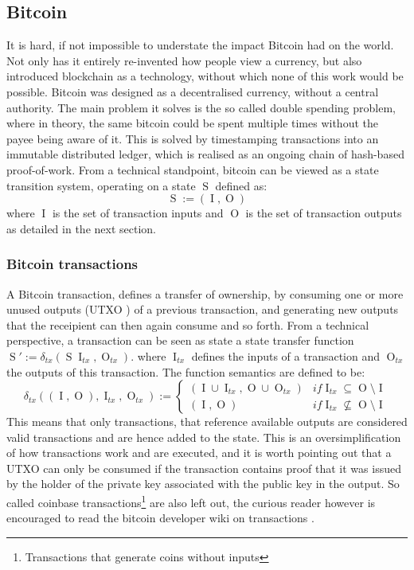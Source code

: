 \documentclass[12pt,msc,a4paper,oneside]{ucl_thesis}
\DeclareMathOperator{\Btcstate}{S}
\DeclareMathOperator{\Btcinput}{I}
\DeclareMathOperator{\Btcoutput}{O}
\begin{document}
\subsection{Bitcoin} \label{sec:background_bitcoin}
It is hard, if not impossible to understate the impact Bitcoin had on the world. Not only has it entirely re-invented how people view a currency, but also introduced blockchain as a technology, without which none of this work would be possible. Bitcoin was designed as a decentralised currency, without a central authority. The main problem it solves is the so called double spending problem, where in theory, the same bitcoin could be spent multiple times without the payee being aware of it. This is solved by timestamping transactions into an immutable distributed ledger, which is realised as an ongoing chain of hash-based proof-of-work. From a technical standpoint, bitcoin can be viewed as a state transition system, operating on a state $\Btcstate$ defined as:
\begin{equation}
    \Btcstate := (\Btcinput, \Btcoutput)
\end{equation}
where $\Btcinput$ is the set of transaction inputs and $\Btcoutput$ is the set of transaction outputs as detailed in the next section.

\subsubsection{Bitcoin transactions}
A Bitcoin transaction, defines a transfer of ownership, by consuming one or more unused outputs (UTXO \cite{bitcoin_wiki:utxo}) of a previous transaction, and generating new outputs that the receipient can then again consume and so forth. From a technical perspective, a transaction can be seen as state a state transfer function $\Btcstate' := \delta_{tx}(\Btcstate \Btcinput_{tx}, \Btcoutput_{tx})$. where $\Btcinput_{tx}$ defines the inputs of a transaction and $\Btcoutput_{tx}$ the outputs of this transaction. The function semantics are defined to be:
\begin{equation}
    \delta_{tx}((\Btcinput, \Btcoutput), \Btcinput_{tx}, \Btcoutput_{tx}) := \begin{cases}
        (\Btcinput \cup \Btcinput_{tx}, \Btcoutput \cup \Btcoutput_{tx}) & if \Btcinput_{tx} \subseteq \Btcoutput \setminus \Btcinput \\
        (\Btcinput, \Btcoutput) & if \Btcinput_{tx} \not\subseteq \Btcoutput \setminus \Btcinput
    \end{cases}
\end{equation}
This means that only transactions, that reference available outputs are considered valid transactions and are hence added to the state. This is an oversimplification of how transactions work and are executed, and it is worth pointing out that a UTXO can only be consumed if the transaction contains proof that it was issued by the holder of the private key associated with the public key in the output. So called coinbase transactions\footnote{Transactions that generate coins without inputs} are also left out, the curious reader however is encouraged to read the bitcoin developer wiki on transactions \cite{bitcoin_wiki:transactions}.
\end{document}
